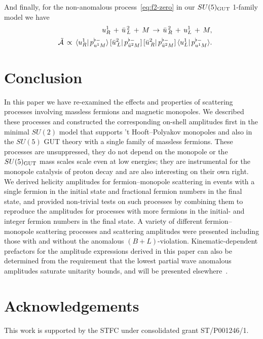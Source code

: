 \documentclass[a4paper,11pt]{article}
\begin{document}
And finally, for the non-anomalous process~\eqref{eq:f2-zero} in our $SU(5)_{\rm GUT}$ 1-family model we have
\begin{eqnarray}
 \label{eq:3.11}
&& u_{R}^1 \,+\,  \bar{u}_{\,L}^{\,2} \,+\, M \,\to\,  \bar{u}_{\,R}^{\,2} \,+\, u_{L}^{1} \,+\, M,\\
\label{eq:3.12}
&&\tilde{\cal A}\, \propto\, 
 \langle u_R^{1} | \, p^{\flat -}_{u^{1} M} \rangle\,  [\bar{u}_{\,L}^{2}| \, p^{\flat -}_{\bar{u}^{2} M} ]\,
 [\bar{u}_{\,R}^{2}| \, p^{\flat -}_{\bar{u}^{2} M} ]\,\langle u_L^{1} | \, p^{\flat -}_{u^{1} M} \rangle.
\end{eqnarray} 

\section{Conclusion}
\label{Sec:concl}

In this paper we have re-examined the effects and properties of scattering processes involving massless fermions and magnetic monopoles. 
We described these processes and constructed the corresponding on-shell amplitudes first in the minimal $SU(2)$ model that supports 't Hooft--Polyakov monopoles and also in the $SU(5)$ GUT theory with a single family of massless fermions.
These processes are unsuppressed, they do not depend on the monopole or the $SU(5)_{\rm GUT}$ mass scales scale even at low energies; they are instrumental for the monopole catalysis of proton decay and are also interesting on their own right. We derived helicity amplitudes 
for fermion--monopole scattering in events with a single fermion in the initial state and fractional fermion numbers in the final state, and provided non-trivial tests on such processes by combining them to reproduce the amplitudes for processes with more fermions in the initial- and integer fermion numbers in the final state. 
A variety of different fermion--monopole scattering processes and  scattering amplitudes were presented including those with and without the
anomalous $(B+L)$-violation.
Kinematic-dependent prefactors for the amplitude expressions derived in this paper can also be determined  from the requirement that the lowest partial wave anomalous amplitudes saturate unitarity bounds, and will be presented elsewhere~\cite{WIP}.


\section*{Acknowledgements}

This work is supported by the STFC under consolidated grant ST/P001246/1.
\end{document}
